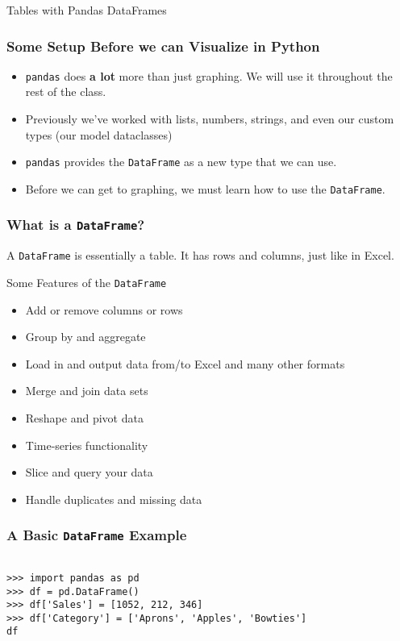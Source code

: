 \documentclass[handout, 11pt]{beamer}
\begin{document}
\begin{section}[Pandas]{Tables with Pandas DataFrames}
\begin{frame}
\frametitle{Some Setup Before we can Visualize in Python}
\begin{itemize}
\item \texttt{pandas}
does
\textbf{a lot}
more than just graphing. We will use it throughout the rest of the class.
\vfill
\item Previously we've worked with lists, numbers, strings, and even our custom types (our model dataclasses)
\vfill
\item \texttt{pandas}
provides the
\texttt{DataFrame}
as a new type that we can use.
\vfill
\item Before we can get to graphing, we must learn how to use the \texttt{DataFrame}.
\end{itemize}
\end{frame}
\begin{frame}
\frametitle{What is a \texttt{DataFrame}?}
A
\texttt{DataFrame}
is essentially a table. It has rows and columns, just like in Excel.
\vfill
\begin{block}{Some Features of the \texttt{DataFrame}}
\begin{itemize}
\item Add or remove columns or rows
\item Group by and aggregate
\item Load in and output data from/to Excel and many other formats
\item Merge and join data sets
\item Reshape and pivot data
\item Time-series functionality
\item Slice and query your data
\item Handle duplicates and missing data
\end{itemize}
\end{block}
\end{frame}
\begin{frame}[fragile]
\frametitle{A Basic \texttt{DataFrame} Example}
\begin{verbatim}

>>> import pandas as pd
>>> df = pd.DataFrame()
>>> df['Sales'] = [1052, 212, 346]
>>> df['Category'] = ['Aprons', 'Apples', 'Bowties']
df


\end{verbatim}
\end{frame}
\end{section}
\end{document}
